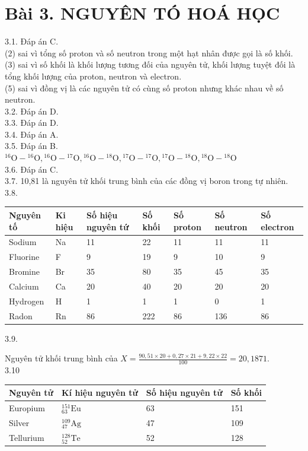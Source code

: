 \documentclass[10pt]{article}
\begin{document}
\section*{Bài 3. NGUYÊN TÓ HOÁ HỌC}
3.1. Đáp án C.\\
(2) sai vì tổng số proton và số neutron trong một hạt nhân được gọi là số khối.\\
(3) sai vì số khối là khối lượng tương đối của nguyên tử, khối lượng tuyệt đối là tổng khối lượng của proton, neutron và electron.\\
(5) sai vì đồng vị là các nguyên tử có cùng số proton nhưng khác nhau về số neutron.\\
3.2. Đáp án D.\\
3.3. Đáp án D.\\
3.4. Đáp án A.\\
3.5. Đáp án B.\\
${ }^{16} \mathrm{O}-{ }^{16} \mathrm{O},{ }^{16} \mathrm{O}-{ }^{17} \mathrm{O},{ }^{16} \mathrm{O}-{ }^{18} \mathrm{O},{ }^{17} \mathrm{O}-{ }^{17} \mathrm{O},{ }^{17} \mathrm{O}-{ }^{18} \mathrm{O},{ }^{18} \mathrm{O}-{ }^{18} \mathrm{O}$\\
3.6. Đáp án C.\\
3.7. 10,81 là nguyên tử khối trung bình của các đồng vị boron trong tự nhiên.\\
3.8.

\begin{center}
\begin{tabular}{|l|l|l|l|l|l|l|}
\hline
Nguyên tố & Ki hiệu & Số hiệu nguyên tứ & Số khối & Số proton & Số neutron & Số electron \\
\hline
Sodium & Na & 11 & 22 & 11 & 11 & 11 \\
\hline
Fluorine & F & 9 & 19 & 9 & 10 & 9 \\
\hline
Bromine & Br & 35 & 80 & 35 & 45 & 35 \\
\hline
Calcium & Ca & 20 & 40 & 20 & 20 & 20 \\
\hline
Hydrogen & H & 1 & 1 & 1 & 0 & 1 \\
\hline
Radon & Rn & 86 & 222 & 86 & 136 & 86 \\
\hline
\end{tabular}
\end{center}

3.9.

Nguyên tử khối trung bình của $X=\frac{90,51 \times 20+0,27 \times 21+9,22 \times 22}{100}=20,1871$.\\
3.10

\begin{center}
\begin{tabular}{|l|l|l|l|}
\hline
Nguyên tử & Kí hiệu nguyên tử & Số hiệu nguyên tử & Số khối \\
\hline
Europium & ${ }_{63}^{151} \mathrm{Eu}$ & 63 & 151 \\
\hline
Silver & ${ }_{47}^{109} \mathrm{Ag}$ & 47 & 109 \\
\hline
Tellurium & ${ }_{52}^{128} \mathrm{Te}$ & 52 & 128 \\
\hline
\end{tabular}
\end{center}
\end{document}

